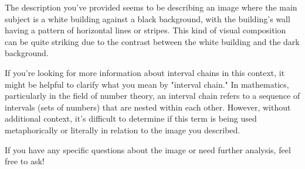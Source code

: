 The description you've provided seems to be describing an image where the main subject is a white building against a black background, with the building's wall having a pattern of horizontal lines or stripes. This kind of visual composition can be quite striking due to the contrast between the white building and the dark background.

If you're looking for more information about interval chains in this context, it might be helpful to clarify what you mean by "interval chain." In mathematics, particularly in the field of number theory, an interval chain refers to a sequence of intervals (sets of numbers) that are nested within each other. However, without additional context, it's difficult to determine if this term is being used metaphorically or literally in relation to the image you described.

If you have any specific questions about the image or need further analysis, feel free to ask!